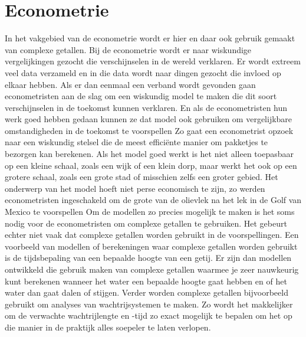 \documentclass[11pt,fleqn]{book} %
\begin{document}
\section{Econometrie}
In het vakgebied van de econometrie wordt er hier en daar ook gebruik gemaakt van complexe getallen. Bij de econometrie wordt er naar wiskundige vergelijkingen gezocht die verschijnselen in de wereld verklaren. Er wordt extreem veel data verzameld en in die data wordt naar dingen gezocht die invloed op elkaar hebben. Als er dan eenmaal een verband wordt gevonden gaan econometristen aan de slag om een wiskundig model te maken die dit soort verschijnselen in de toekomst kunnen verklaren. En als de econometristen hun werk goed hebben gedaan kunnen ze dat model ook gebruiken om vergelijkbare omstandigheden in de toekomst te voorspellen
Zo gaat een econometrist opzoek naar een wiskundig stelsel die de meest efficiënte manier om pakketjes te bezorgen kan berekenen. Als het model goed werkt is het niet alleen toepasbaar op een kleine schaal, zoals een wijk of een klein dorp, maar werkt het ook op een grotere schaal, zoals een grote stad of misschien zelfs een groter gebied. Het onderwerp van het model hoeft niet perse economisch te zijn, zo werden econometristen ingeschakeld om de grote van de olievlek na het lek in de Golf van Mexico te voorspellen
Om de modellen zo precies mogelijk te maken is het soms nodig voor de econometristen om complexe getallen te gebruiken. Het gebeurt echter niet vaak dat complexe getallen worden gebruikt in de voorspellingen. Een voorbeeld van modellen of berekeningen waar complexe getallen worden gebruikt is de tijdsbepaling van een bepaalde hoogte van een getij. Er zijn dan modellen ontwikkeld die gebruik maken van complexe getallen waarmee je zeer nauwkeurig kunt berekenen wanneer het water een bepaalde hoogte gaat hebben en of het water dan gaat dalen of stijgen. Verder worden complexe getallen bijvoorbeeld gebruikt om analyses van wachtrijsystemen te maken. Zo wordt het makkelijker om de verwachte wachtrijlengte en -tijd zo exact mogelijk te bepalen om het op die manier in de praktijk alles soepeler te laten verlopen.
\end{document}

